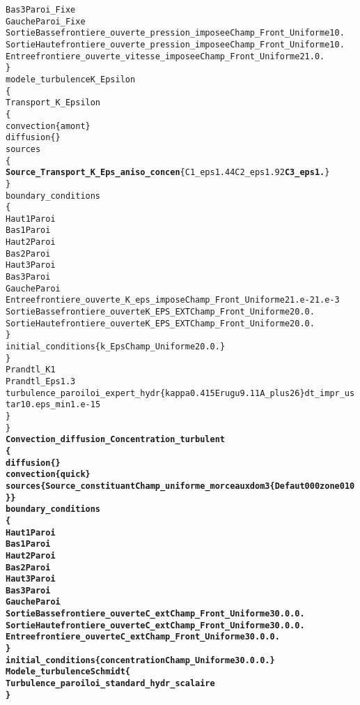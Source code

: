 \begin{alltt}
             Bas3 Paroi_Fixe
             Gauche Paroi_Fixe
             SortieBasse frontiere_ouverte_pression_imposee Champ_Front_Uniforme 1 0.
             SortieHaute frontiere_ouverte_pression_imposee Champ_Front_Uniforme 1 0.
             Entree frontiere_ouverte_vitesse_imposee Champ_Front_Uniforme 2  1. 0.
        \}
        modele_turbulence K_Epsilon
        \{
            Transport_K_Epsilon 
            \{
                convection \{ amont \}
                diffusion \{ \}
                sources 
                \{ 
                  {\bf{Source_Transport_K_Eps_aniso_concen}} \{ C1_eps 1.44 C2_eps 1.92 {\bf{C3_eps 1.}} \}
                \}
                boundary_conditions
                \{
                    Haut1 Paroi
                    Bas1 Paroi
                    Haut2 Paroi
                    Bas2 Paroi
                    Haut3 Paroi
                    Bas3 Paroi
                    Gauche Paroi
                    Entree frontiere_ouverte_K_eps_impose Champ_Front_Uniforme 2 1.e-2 1.e-3
                    SortieBasse frontiere_ouverte K_EPS_EXT Champ_Front_Uniforme 2 0. 0.
                    SortieHaute frontiere_ouverte K_EPS_EXT Champ_Front_Uniforme 2 0. 0.
                \}
                initial_conditions \{ k_Eps Champ_Uniforme 2 0. 0. \}
             \}
             Prandtl_K 1
             Prandtl_Eps 1.3
             turbulence_paroi loi_expert_hydr \{ kappa 0.415 Erugu 9.11 A_plus 26 \} dt_impr_ustar 10. eps_min 1.e-15
        \}
    \}
    {\bf{Convection_diffusion_Concentration_turbulent }}
    {\bf{\{ }}
        {\bf{diffusion \{ \} }}
        {\bf{convection \{ quick \} }}
        {\bf{sources \{ Source_constituant Champ_uniforme_morceaux dom 3 \{ Defaut 0 0 0 zone 0 1 0 \} \} }}
        {\bf{boundary_conditions }}
        {\bf{\{ }}
             {\bf{Haut1          Paroi }}
             {\bf{Bas1           Paroi }}
             {\bf{Haut2          Paroi }}
             {\bf{Bas2           Paroi }}
             {\bf{Haut3          Paroi }}
             {\bf{Bas3           Paroi }}
             {\bf{Gauche         Paroi }}
             {\bf{SortieBasse    frontiere_ouverte C_ext Champ_Front_Uniforme 3 0. 0. 0. }}
             {\bf{SortieHaute    frontiere_ouverte C_ext Champ_Front_Uniforme 3 0. 0. 0. }}
             {\bf{Entree         frontiere_ouverte C_ext Champ_Front_Uniforme 3 0. 0. 0. }}
        {\bf{\} }}
        {\bf{initial_conditions \{ concentration Champ_Uniforme 3 0. 0. 0. \} }}
        {\bf{Modele_turbulence Schmidt \{ }}
            {\bf{Turbulence_paroi loi_standard_hydr_scalaire }}
        {\bf{\} }}

\end{alltt}
